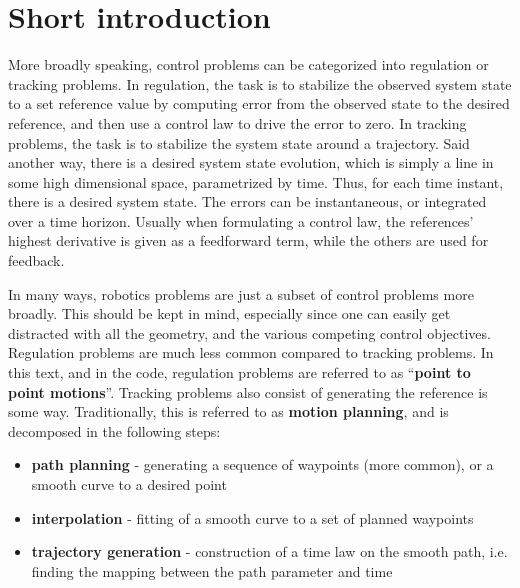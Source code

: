 \section{Short introduction}
More broadly speaking, control problems can be categorized
into regulation or tracking problems.
In regulation, the task is to stabilize the observed
system state to a set reference value by computing
error from the observed state to the desired reference,
and then use a control law to drive the error to zero.
In tracking problems, the task is to stabilize
the system state around a trajectory. Said another way,
there is a desired system state evolution,
which is simply a line in some high dimensional space, parametrized by time.
Thus, for each time instant, there is a desired system state.
The errors can be instantaneous, or integrated over a time horizon.
Usually when formulating a control law, the references' highest derivative 
is given as a feedforward term, while the others are used for 
feedback.

In many ways, robotics problems are just a subset of control
problems more broadly. This should be kept in mind,
especially since one can easily get distracted with all the geometry,
and the various competing control objectives.
Regulation problems are much less common compared
to tracking problems.
In this text, and in the code, regulation problems are referred to 
as ``\textbf{point to point motions}''.
Tracking problems also consist of generating the reference is some way.
Traditionally, this is referred to as
\textbf{motion planning}, and is
decomposed in the following steps:
\begin{itemize}
\item \textbf{path planning} - generating a sequence of waypoints
	(more common),
	or a smooth curve to a desired point
\item \textbf{interpolation} - fitting of a smooth curve
	to a set of planned waypoints
\item \textbf{trajectory generation} - construction of a
	time law on the smooth path, i.e. finding the mapping
	between the path parameter and time
\end{itemize}

